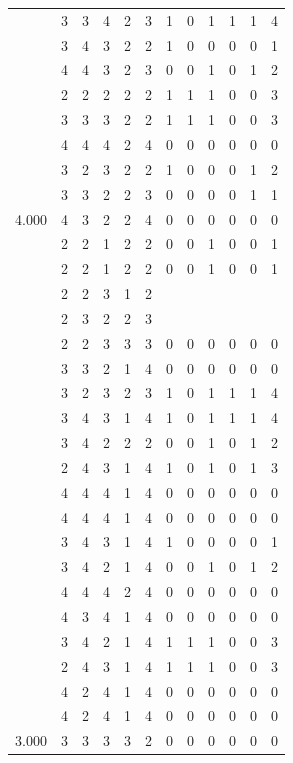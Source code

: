 \documentclass[]{book}
\theoremstyle{definition}
\theoremstyle{definition}
\theoremstyle{definition}
\theoremstyle{remark}
\begin{document}
\begin{table}
{\begin{tabular}[t]{rrrrrrrrrrrr}
 & 3 & 3 & 4 & 2 & 3 & 1 & 0 & 1 & 1 & 1 & 4\\
 & 3 & 4 & 3 & 2 & 2 & 1 & 0 & 0 & 0 & 0 & 1\\
 & 4 & 4 & 3 & 2 & 3 & 0 & 0 & 1 & 0 & 1 & 2\\
 & 2 & 2 & 2 & 2 & 2 & 1 & 1 & 1 & 0 & 0 & 3\\
 & 3 & 3 & 3 & 2 & 2 & 1 & 1 & 1 & 0 & 0 & 3\\
 & 4 & 4 & 4 & 2 & 4 & 0 & 0 & 0 & 0 & 0 & 0\\
 & 3 & 2 & 3 & 2 & 2 & 1 & 0 & 0 & 0 & 1 & 2\\
 & 3 & 3 & 2 & 2 & 3 & 0 & 0 & 0 & 0 & 1 & 1\\
4.000 & 4 & 3 & 2 & 2 & 4 & 0 & 0 & 0 & 0 & 0 & 0\\
 & 2 & 2 & 1 & 2 & 2 & 0 & 0 & 1 & 0 & 0 & 1\\
 & 2 & 2 & 1 & 2 & 2 & 0 & 0 & 1 & 0 & 0 & 1\\
 & 2 & 2 & 3 & 1 & 2 &  &  &  &  &  & \\
 & 2 & 3 & 2 & 2 & 3 &  &  &  &  &  & \\
 & 2 & 2 & 3 & 3 & 3 & 0 & 0 & 0 & 0 & 0 & 0\\
 & 3 & 3 & 2 & 1 & 4 & 0 & 0 & 0 & 0 & 0 & 0\\
 & 3 & 2 & 3 & 2 & 3 & 1 & 0 & 1 & 1 & 1 & 4\\
 & 3 & 4 & 3 & 1 & 4 & 1 & 0 & 1 & 1 & 1 & 4\\
 & 3 & 4 & 2 & 2 & 2 & 0 & 0 & 1 & 0 & 1 & 2\\
 & 2 & 4 & 3 & 1 & 4 & 1 & 0 & 1 & 0 & 1 & 3\\
 & 4 & 4 & 4 & 1 & 4 & 0 & 0 & 0 & 0 & 0 & 0\\
 & 4 & 4 & 4 & 1 & 4 & 0 & 0 & 0 & 0 & 0 & 0\\
 & 3 & 4 & 3 & 1 & 4 & 1 & 0 & 0 & 0 & 0 & 1\\
 & 3 & 4 & 2 & 1 & 4 & 0 & 0 & 1 & 0 & 1 & 2\\
 & 4 & 4 & 4 & 2 & 4 & 0 & 0 & 0 & 0 & 0 & 0\\
 & 4 & 3 & 4 & 1 & 4 & 0 & 0 & 0 & 0 & 0 & 0\\
 & 3 & 4 & 2 & 1 & 4 & 1 & 1 & 1 & 0 & 0 & 3\\
 & 2 & 4 & 3 & 1 & 4 & 1 & 1 & 1 & 0 & 0 & 3\\
 & 4 & 2 & 4 & 1 & 4 & 0 & 0 & 0 & 0 & 0 & 0\\
 & 4 & 2 & 4 & 1 & 4 & 0 & 0 & 0 & 0 & 0 & 0\\
3.000 & 3 & 3 & 3 & 3 & 2 & 0 & 0 & 0 & 0 & 0 & 0\\

\end{tabular}}
\end{table}
\end{document}

